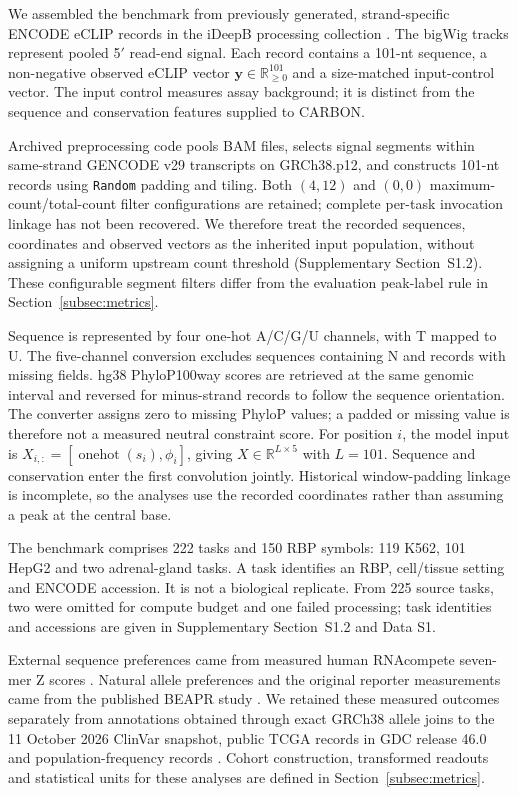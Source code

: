 \documentclass[webpdf,contemporary,large]{oup-authoring-template}
\newcommand{\supsect}[1]{Supplementary Section~#1}
\begin{document}
We assembled the benchmark from previously generated, strand-specific ENCODE eCLIP records \citep{encode2020expanded} in the iDeepB processing collection \citep{liu2025ideepb}. The bigWig tracks \citep{kent2010bigwig} represent pooled 5$'$ read-end signal. Each record contains a 101-nt sequence, a non-negative observed eCLIP vector $\mathbf y\in\mathbb R_{\geq0}^{101}$ and a size-matched input-control vector. The input control measures assay background; it is distinct from the sequence and conservation features supplied to CARBON.

Archived preprocessing code pools BAM files, selects signal segments within same-strand GENCODE v29 transcripts on GRCh38.p12, and constructs 101-nt records using \texttt{Random} padding and tiling. Both $(4,12)$ and $(0,0)$ maximum-count/total-count filter configurations are retained; complete per-task invocation linkage has not been recovered. We therefore treat the recorded sequences, coordinates and observed vectors as the inherited input population, without assigning a uniform upstream count threshold (\supsect{S1.2}). These configurable segment filters differ from the evaluation peak-label rule in Section~\ref{subsec:metrics}.

Sequence is represented by four one-hot A/C/G/U channels, with T mapped to U. The five-channel conversion excludes sequences containing N and records with missing fields. hg38 PhyloP100way scores \citep{pollard2010phylop} are retrieved at the same genomic interval and reversed for minus-strand records to follow the sequence orientation. The converter assigns zero to missing PhyloP values; a padded or missing value is therefore not a measured neutral constraint score. For position $i$, the model input is $X_{i,:}=[\operatorname{onehot}(s_i),\phi_i]$, giving $X\in\mathbb R^{L\times5}$ with $L=101$. Sequence and conservation enter the first convolution jointly. Historical window-padding linkage is incomplete, so the analyses use the recorded coordinates rather than assuming a peak at the central base.

The benchmark comprises 222 tasks and 150 RBP symbols: 119 K562, 101 HepG2 and two adrenal-gland tasks. A task identifies an RBP, cell/tissue setting and ENCODE accession. It is not a biological replicate. From 225 source tasks, two were omitted for compute budget and one failed processing; task identities and accessions are given in \supsect{S1.2} and Data S1.

External sequence preferences came from measured human RNAcompete seven-mer Z scores \citep{ray2013compendium}. Natural allele preferences and the original reporter measurements came from the published BEAPR study \citep{yang2019asb}. We retained these measured outcomes separately from annotations obtained through exact GRCh38 allele joins to the 11 October 2026 ClinVar snapshot, public TCGA records in GDC release 46.0 and population-frequency records \citep{landrum2018clinvar,grossman2016gdc}. Cohort construction, transformed readouts and statistical units for these analyses are defined in Section~\ref{subsec:metrics}.
\end{document}
